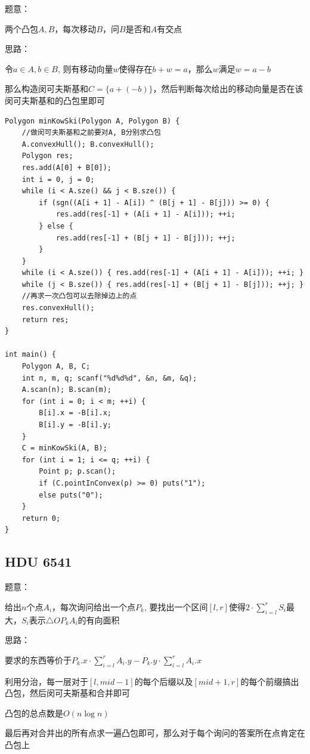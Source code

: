 题意：\par
两个凸包$A, B$，每次移动$B$，问$B$是否和$A$有交点\par
思路：\par
令$a \in A, b \in B$, 则有移动向量$w$使得存在$b + w = a$，那么$w$满足$w = a - b$\par
那么构造闵可夫斯基和$C = \{a + (-b)\}$，然后判断每次给出的移动向量是否在该闵可夫斯基和的凸包里即可\par

\begin{lstlisting}
Polygon minKowSki(Polygon A, Polygon B) {
	//做闵可夫斯基和之前要对A, B分别求凸包
	A.convexHull(); B.convexHull();
	Polygon res;
	res.add(A[0] + B[0]); 
	int i = 0, j = 0;
	while (i < A.sze() && j < B.sze()) {
		if (sgn((A[i + 1] - A[i]) ^ (B[j + 1] - B[j])) >= 0) {
			res.add(res[-1] + (A[i + 1] - A[i])); ++i;
		} else {
			res.add(res[-1] + (B[j + 1] - B[j])); ++j;
		}
	}
	while (i < A.sze()) { res.add(res[-1] + (A[i + 1] - A[i])); ++i; }
	while (j < B.sze()) { res.add(res[-1] + (B[j + 1] - B[j])); ++j; }
	//再求一次凸包可以去除掉边上的点
	res.convexHull();
	return res;
}

int main() {
	Polygon A, B, C;
	int n, m, q; scanf("%d%d%d", &n, &m, &q);
	A.scan(n); B.scan(m);
	for (int i = 0; i < m; ++i) {
		B[i].x = -B[i].x;
		B[i].y = -B[i].y;
	}
	C = minKowSki(A, B);
	for (int i = 1; i <= q; ++i) {
		Point p; p.scan();
		if (C.pointInConvex(p) >= 0) puts("1");
		else puts("0");	
	}
	return 0;
}
\end{lstlisting}

\subsection{HDU 6541}
题意：\par
给出$n$个点$A_i$，每次询问给出一个点$P_k$, 要找出一个区间$[l, r]$使得$2 \cdot \sum\limits_{i = l}^r S_i$最大，$S_i$表示$\triangle OP_kA_i$的有向面积\par
思路：\par
要求的东西等价于$P_k.x \cdot \sum\limits_{i = l}^r A_i.y - P_k.y \cdot \sum\limits_{i = l}^r A_i.x$\par
利用分治，每一层对于$[l, mid - 1]$的每个后缀以及$[mid + 1, r]$的每个前缀搞出凸包，然后闵可夫斯基和合并即可\par
凸包的总点数是$O(n \log n)$\par
最后再对合并出的所有点求一遍凸包即可，那么对于每个询问的答案所在点肯定在凸包上\par

